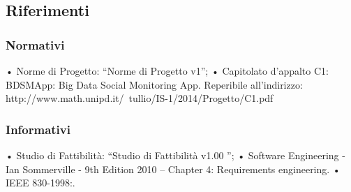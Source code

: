 \subsection{Riferimenti}
\subsubsection{Normativi}
• Norme di Progetto: “Norme di Progetto v1”;
• Capitolato d’appalto C1: BDSMApp: Big Data Social Monitoring App. Reperibile
all’indirizzo: http://www.math.unipd.it/~tullio/IS-1/2014/Progetto/C1.pdf

\subsubsection{Informativi}
• Studio di Fattibilità: “Studio di Fattibilità v1.00 ”;
• Software Engineering - Ian Sommerville - 9th Edition 2010
– Chapter 4: Requirements engineering.
• IEEE 830-1998:.